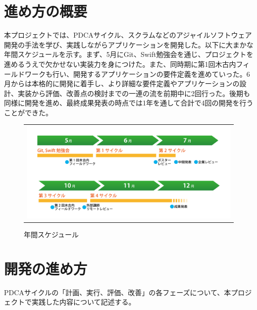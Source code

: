 \section{進め方の概要}
本プロジェクトでは、PDCAサイクル、スクラムなどのアジャイルソフトウェア開発の手法を学び、実践しながらアプリケーションを開発した。以下に大まかな年間スケジュールを示す。まず、5月にGit、Swift勉強会を通じ、プロジェクトを進めるうえで欠かせない実装力を身につけた。また、同時期に第1回木古内フィールドワークも行い、開発するアプリケーションの要件定義を進めていった。6月からは本格的に開発に着手し、より詳細な要件定義やアプリケーションの設計、実装から評価、改善点の検討までの一連の流を前期中に2回行った。後期も同様に開発を進め、最終成果発表の時点では1年を通して合計で4回の開発を行うことができた。
\begin{figure}[htbp]
  \begin{center}
    \begin{tabular}{c}

      \begin{minipage}{0.7\hsize}
        \begin{center}
\includegraphics[width=15cm, bb=0 0 1478 674]{procedure-1.png}
       
        \end{center}
      \end{minipage}

    \end{tabular}
    \caption{年間スケジュール}
    \label{fig:lena}
  \end{center}
\end{figure}



\section{開発の進め方}
PDCAサイクルの「計画、実行、評価、改善」の各フェーズについて、本プロジェクトで実践した内容について記述する。
